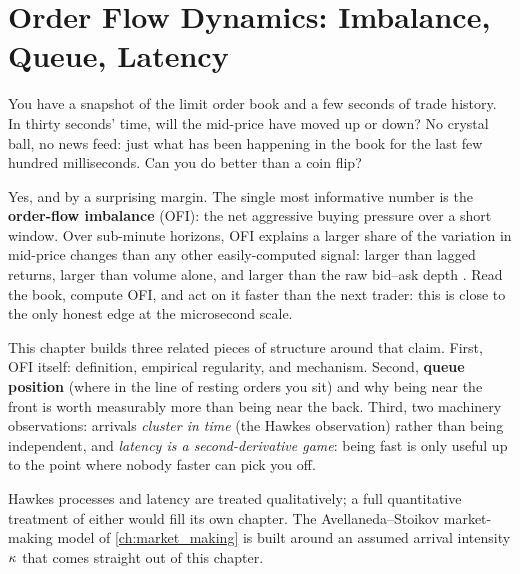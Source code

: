 \chapter{Order Flow Dynamics: Imbalance, Queue, Latency}
\label{ch:order_flow}

You have a snapshot of the limit order book and a few seconds of
trade history. In thirty seconds' time, will the mid-price have
moved up or down? No crystal ball, no news feed: just what has
been happening in the book for the last few hundred milliseconds.
Can you do better than a coin flip?

Yes, and by a surprising margin. The single most informative
number is the \textbf{order-flow imbalance} (OFI): the net
aggressive buying pressure over a short window. Over sub-minute
horizons, OFI explains a larger share of the variation in
mid-price changes than any other easily-computed signal: larger
than lagged returns, larger than volume alone, and larger than the
raw bid--ask depth \citeBouchaud. Read the book, compute OFI, and
act on it faster than the next trader: this is close to the only
honest edge at the microsecond scale.

This chapter builds three related pieces of structure around that
claim. First, OFI itself: definition, empirical regularity, and
mechanism. Second, \textbf{queue position} (where in the line
of resting orders you sit) and why being near the front is
worth measurably more than being near the back. Third, two
machinery observations: arrivals \emph{cluster in time} (the
Hawkes observation) rather than being independent, and
\emph{latency is a second-derivative game}: being fast is only
useful up to the point where nobody faster can pick you off.

Hawkes processes and latency are treated qualitatively; a full
quantitative treatment of either would fill its own chapter. The
Avellaneda--Stoikov market-making model of
\cref{ch:market_making} is built around an assumed arrival
intensity $\kappa$ that comes straight out of this chapter.

